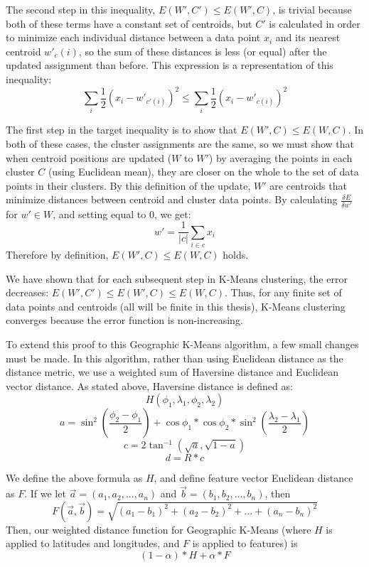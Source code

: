 \documentclass[times new roman,12pt]{article}
\begin{document}
The second step in this inequality, $E(W',C')\leq{E(W',C)}$, is trivial because both of these terms have a constant set of centroids, but $C'$ is calculated in order to minimize each individual distance between a data point $x_i$ and its nearest centroid $w'_c(i)$, so the sum of these distances is less (or equal) after the updated assignment than before. This expression is a representation of this inequality: $$\sum_i{\frac{1}{2}(x_i-w'_{c'(i)})^2} \leq \sum_i{\frac{1}{2}(x_i-w'_{c(i)})^2}$$

The first step in the target inequality is to show that $E(W',C)\leq{E(W,C)}$. In both of these cases, the cluster assignments are the same, so we must show that when centroid positions are updated ($W$ to $W'$) by averaging the points in each cluster $C$ (using Euclidean mean), they are closer on the whole to the set of data points in their clusters. By this definition of the update, $W'$ are centroids that minimize distances between centroid and cluster data points. By calculating $\frac{\delta E}{\delta w'}$ for $w' \in{W}$, and setting equal to 0, we get: $$w'=\frac{1}{|c|}\sum_{i \in c}x_i$$ Therefore by definition, $E(W',C)\leq{E(W,C)}$ holds.

We have shown that for each subsequent step in K-Means clustering, the error decreases: $E(W',C')\leq{E(W',C)}\leq{E(W,C)}$. Thus, for any finite set of data points and centroids (all will be finite in this thesis), K-Means clustering converges because the error function is non-increasing. 

\vspace{10mm}

To extend this proof to this Geographic K-Means algorithm, a few small changes must be made. In this algorithm, rather than using Euclidean distance as the distance metric, we use a weighted sum of Haversine distance and Euclidean vector distance. As stated above, Haversine distance is defined as: $$H(\phi_1, \lambda_1, \phi_2, \lambda_2)$$ $$ a = \sin^{2}(\frac{\phi_2-\phi_1}{2}) + \cos{\phi_1}*\cos{\phi_2}*\sin^{2}(\frac{\lambda_2-\lambda_1}{2})$$ $$ c = 2\tan^{-1}(\sqrt{a}, \sqrt{1-a})$$ $$ d = R*c$$

We define the above formula as $H$, and define feature vector Euclidean distance as $F$. If we let $\vec{a}=(a_1, a_2,...,a_n)$ and $\vec{b}=(b_1,b_2,...,b_n)$, then $$F(\vec{a},\vec{b})=\sqrt{(a_1-b_1)^2+(a_2-b_2)^2+...+(a_n-b_n)^2}$$Then, our weighted distance function for Geographic K-Means (where $H$ is applied to latitudes and longitudes, and $F$ is applied to features) is $$(1-\alpha)*H + \alpha*F$$
\end{document}
